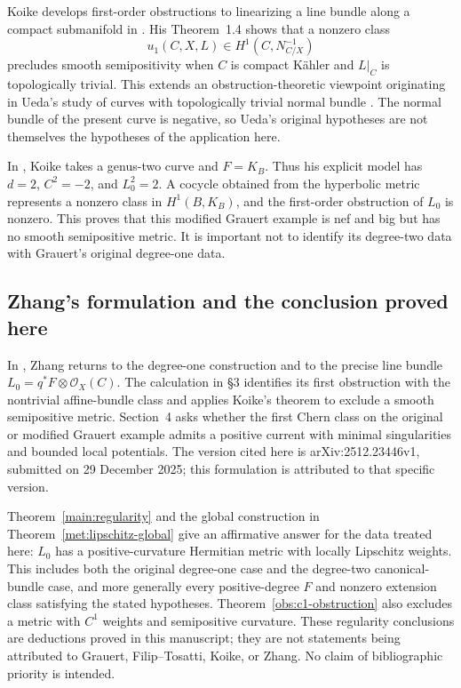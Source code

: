 \documentclass[11pt,a4paper]{article}
\numberwithin{equation}{section}
\theoremstyle{definition}
\theoremstyle{remark}
\begin{document}
Koike develops first-order obstructions to linearizing a line bundle along
a compact submanifold in \cite{Koike2021}.  His Theorem~1.4 shows that a
nonzero class
\[
  u_1(C,X,L)\in H^1(C,N_{C/X}^{-1})
\]
precludes smooth semipositivity when $C$ is compact K\"ahler and $L|_C$ is
topologically trivial.  This extends an obstruction-theoretic viewpoint
originating in Ueda's study of curves with topologically trivial normal
bundle \cite{Ueda1983}.  The normal bundle of the present curve is negative,
so Ueda's original hypotheses are not themselves the hypotheses of the
application here.

In \cite[Example~4.1, pp.~2262--2263]{Koike2021}, Koike takes a genus-two curve
and $F=K_B$.  Thus his explicit model has $d=2$, $C^2=-2$, and
$L_0^2=2$.  A cocycle obtained from the hyperbolic metric represents a
nonzero class in $H^1(B,K_B)$, and the first-order obstruction of $L_0$ is
nonzero.  This proves that this modified Grauert example is nef and big
but has no smooth semipositive metric.  It is important not to identify
its degree-two data with Grauert's original degree-one data.

\subsection{Zhang's formulation and the conclusion proved here}
\label{hist:zhang}

In \cite{Zhang2025}, Zhang returns to the degree-one construction and to
the precise line bundle $L_0=q^*F\otimes\mathcal O_X(C)$.  The calculation
in \S3 identifies its first obstruction with the nontrivial affine-bundle
class and applies Koike's theorem to exclude a smooth semipositive metric.
Section~4 asks whether the first Chern class on the original or modified
Grauert example admits a positive current with minimal singularities and
bounded local potentials.  The version cited here is arXiv:2512.23446v1,
submitted on 29 December 2025; this formulation is attributed to that
specific version.

Theorem~\ref{main:regularity} and the global construction in
Theorem~\ref{met:lipschitz-global} give an affirmative answer for the data treated
here: $L_0$ has a positive-curvature Hermitian metric with locally Lipschitz
weights.  This includes both the original degree-one case and the
degree-two canonical-bundle case, and more generally every positive-degree
$F$ and nonzero extension class satisfying the stated hypotheses.
Theorem~\ref{obs:c1-obstruction} also excludes a metric with
$C^1$ weights and semipositive curvature.  These regularity conclusions
are deductions proved in this manuscript; they are not statements being
attributed to Grauert, Filip--Tosatti, Koike, or Zhang.  No claim of
bibliographic priority is intended.
\end{document}
